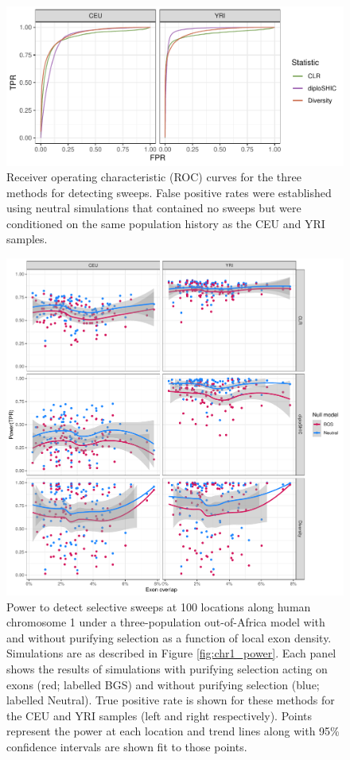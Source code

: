 \documentclass[hidelinks]{article}
\newcommand{\stopsupplement}{%
        \setcounter{table}{0}
        \renewcommand{\thetable}{\arabic{table}}%
        \setcounter{figure}{0}
        \renewcommand{\thefigure}{\arabic{figure}}%
     }
\begin{document}
\begin{figure}
    \centering
    \includegraphics[width=0.8 \textwidth]{figures/sweeps/roc_neutral_null.pdf}
    \caption{
    \label{fig:roc-curves}
    Receiver operating characteristic (ROC) curves for the three methods for detecting sweeps.
    False positive rates were established using neutral simulations that contained no sweeps
    but were conditioned on the same population history as the CEU and YRI samples.
    }
\end{figure}


\begin{figure}
    \centering
    \includegraphics[width=0.8 \textwidth]{figures/sweeps/relationship_power_exon.pdf}
    \caption{
    Power to detect selective sweeps at 100 locations along human chromosome 1 under a three-population out-of-Africa model \citep{gutenkunst2009inferring}  
    with and without purifying selection as a function of local exon density.
    Simulations are as described in Figure \ref{fig:chr1_power}.
    Each panel shows the results of simulations with purifying selection acting on exons (red; labelled BGS)
    and without purifying selection (blue; labelled Neutral).
    True positive rate is shown for these methods for the CEU and YRI samples (left and right respectively).
    Points represent the power at each location and trend lines along with 95\% confidence intervals are shown fit to those points.
    }
    \label{fig:power-exon}
\end{figure}


\stopsupplement
\end{document}
